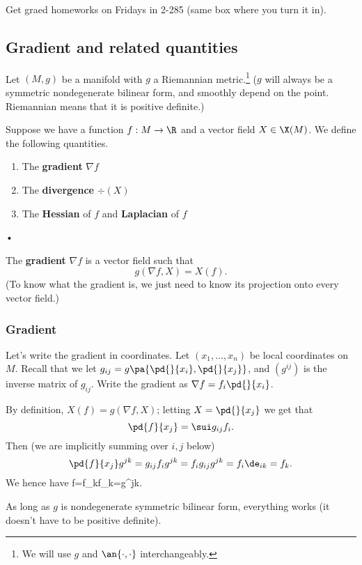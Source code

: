 
%
Get graed homeworks on Fridays in 2-285 (same box where you turn it in).

\subsection{Gradient and related quantities}
Let $(M,g)$ be a manifold with $g$ a Riemannian metric.\footnote{We will use $g$ and $\an{\cdot,\cdot}$ interchangeably.} ($g$ will always be a symmetric nondegenerate bilinear form, and smoothly depend on the point. Riemannian means that it is positive definite.)

Suppose we have a function $f:M\to \R$ and a vector field $X\in \X(M)$. We define the following quantities.
\begin{enumerate}
\item
The \textbf{gradient} $\nabla f$%
\item
The \textbf{divergence} $\div(X)$
\item
The \textbf{Hessian} of $f$ and \textbf{Laplacian} of $f$
\end{enumerate}•

\begin{df}

The \textbf{gradient} $\nabla f$ is a vector field such that
\[
g(\nabla f,X)=X(f).
\]
(To know what the gradient is, we just need to know its projection onto every vector field.)
\end{df}

\subsubsection{Gradient}

Let's write the gradient in coordinates. Let $(x_1,\ldots, x_n)$ be local coordinates on $M$. Recall that we let $g_{ij}=g\pa{\pd{}{x_i},\pd{}{x_j}}$, and $(g^{ij})$ is the inverse matrix of $g_{ij}$. Write the gradient as $\nabla f=f_i\pd{}{x_i}$.

By definition, $X(f)=g(\nabla f,X)$; letting $X=\pd{}{x_j}$ we get that 
\[
\pd{f}{x_j}=\sui g_{ij}f_i.
\]
Then (we are implicitly summing over $i,j$ below)
\[
\pd{f}{x_j}g^{jk} = g_{ij}f_ig^{jk}=f_ig_{ij}g^{jk}=f_i\de_{ik}=f_k.
\]
We hence have 
\nabla f=f_kf_k=g^{jk}.
\eeq

As long as $g$ is nondegenerate symmetric bilinear form, everything works (it doesn't have to be positive definite).


